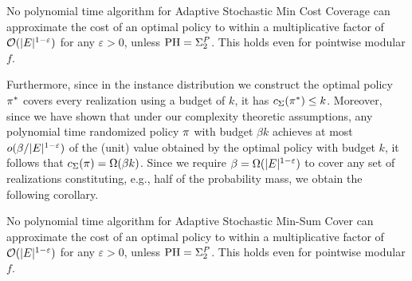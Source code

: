 \begin{corollary} \label{thm:coverage-hardness}
%
No polynomial time algorithm for Adaptive Stochastic Min
Cost Coverage
can approximate the cost of an optimal policy 
to within a multiplicative factor of ${\mathcal{O}}(|E|^{1-\varepsilon})$ for any
$\varepsilon > 0$, unless $\textrm{PH} = \Sigma^P_2$. This holds even for pointwise modular $f$.
\end{corollary}

Furthermore, since in the instance distribution we construct the
optimal policy $\pi^*$ covers every realization using a budget of $k$, it has 
$c_{\Sigma}\! \left( {\pi^*} \right)  \le k$.  Moreover, 
since we have shown that under our
complexity theoretic assumptions, any polynomial time randomized
policy $\pi$ with budget $\beta k$ achieves at most
$o(\beta / |E|^{1-\varepsilon})$ of the (unit) value obtained by the
optimal policy with budget $k$, it follows that 
$c_{\Sigma}\! \left( {\pi} \right)  = \Omega(\beta k)$.  Since we require $\beta =
\Omega(|E|^{1-\varepsilon})$ to cover any set of
realizations constituting, e.g., half of the probability mass, we obtain the following corollary.

\begin{corollary} \label{thm:min-sum-hardness}
%
No polynomial time algorithm for Adaptive Stochastic Min-Sum Cover
can approximate the cost of an optimal policy 
to within a multiplicative factor of ${\mathcal{O}}(|E|^{1-\varepsilon})$ for any
$\varepsilon > 0$, unless $\textrm{PH} = \Sigma^P_2$. This holds even for pointwise modular $f$.
\end{corollary}


%
%
%
%
%
